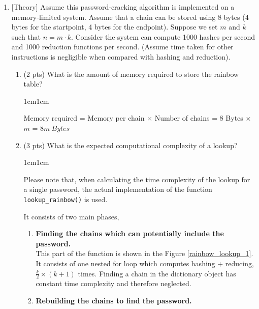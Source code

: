\documentclass[11pt,letterpaper]{article}
\newenvironment{answer}{\em \color{blue} \begin{adjustwidth}{1cm}{1cm}}{\end{adjustwidth}}
\begin{document}
\begin{enumerate}
\begin{answer}
		\end{answer}
		
		\item $[$Theory$]$ Assume this password-cracking algorithm is implemented on a memory-limited system. Assume that a chain can be stored using 8 bytes (4 bytes for the startpoint, 4 bytes for the endpoint). Suppose we set $m$ and $k$ such that $n = m \cdot k$. Consider the system can compute 1000 hashes per second and 1000 reduction functions per second. (Assume time taken for other instructions is negligible when compared with hashing and reduction).
		
		\begin{enumerate}
			
			\item (2 pts) What is the amount of memory required to store the rainbow table?
			
			\begin{answer}
				
				Memory required = Memory per chain $\times$ Number of chains = 8 Bytes $\times$ $m$ = $8m~ Bytes$
				
			\end{answer}
			
			\item (3 pts) What is the expected computational complexity of a lookup?
			
			\begin{answer}
				
				Please note that, when calculating the time complexity of the lookup for a single password, the actual implementation of the function {\tt lookup\_rainbow()}  is used.
				
				It consists of two main phases,
				
				\begin{enumerate}
					\item \textbf{Finding the chains which can potentially include the password.}\\
					
					This part of the function is shown in the Figure \ref{rainbow_lookup_1}. It consists of one nested for loop which computes hashing $+$ reducing, $\frac{k}{2}\times\left( k+1 \right)$ times. Finding a chain in the dictionary object has constant time complexity and therefore neglected.\\
					
					\item \textbf{Rebuilding the chains to find the password.}\\
					

\end{enumerate}
\end{answer}
\end{enumerate}
\end{enumerate}
\end{document}
